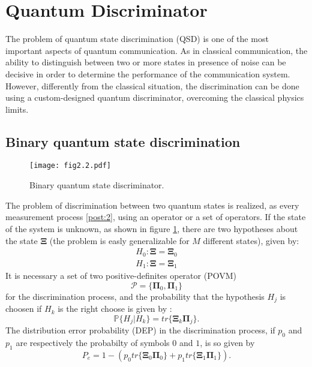 \section{Quantum Discriminator}
    The problem of quantum state discrimination (QSD) is one of the most important
    aspects of quantum communication. As in classical communication, the ability to 
    distinguish between two or more states in presence of noise can be decisive in order to determine
    the performance of the communication system. However, differently from the classical situation,
    the discrimination can be done using a custom-designed quantum discriminator, overcoming
    the classical physics limits.

    \subsection{Binary quantum state discrimination}
    \begin{figure}[ht]
        \begin{center}
            \texttt{[image: fig2.2.pdf]}
            \caption{Binary quantum state discriminator.}
            \label{fig:2.2}
        \end{center}
    \end{figure}
    The problem of discrimination between two quantum states is realized, as every measurement
    process \ref{post:2}, using an operator or a set of operators.
    If the state of the system is unknown, as shown in figure \ref{fig:2.2}, there are two hypotheses
    about the state $\pmb{\Xi}$ (the problem is easly generalizable for $M$ different states),
    given by:
    \begin{equation}\begin{split}
        H_0 : \pmb{\Xi}=\pmb{\Xi}_0\\
        H_1 : \pmb{\Xi}=\pmb{\Xi}_1
        \label{eq:binHyp}
    \end{split}\end{equation}
    It is necessary a set of two positive-definites operator (POVM)
    \begin{equation}
        \mathcal{P}=\{\pmb{\Pi}_0,\pmb{\Pi}_1\}
    \end{equation}
    for the discrimination process, and the probability that the hypothesis $H_j$ is choosen
    if $H_k$ is the right choose is given by \cite{tesiGuerrini}:
    \begin{equation}
        \mathbb{P}\{H_j|H_k\}=tr\{\pmb{\Xi}_k\pmb{\Pi}_j\}.
    \end{equation}
    The distribution error probability (DEP) in the discrimination process, if $p_0$ and $p_1$ are 
    respectively the probabilty of symbols $0$ and $1$, is so given by
    \begin{equation}
        P_e=1-\left(p_0 tr\{\pmb{\Xi}_0\pmb{\Pi}_0\}+p_1 tr\{\pmb{\Xi}_1\pmb{\Pi}_1\}\right).
    \end{equation}

